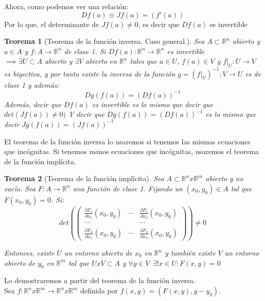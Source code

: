 \documentclass[11pt, a4paper, titlepage]{article}
\makeatletter
\renewenvironment{proof}[1][\proofname] {\vspace{-15pt}\par\pushQED{\qed}\normalfont\topsep6\p@\@plus6\p@\relax\trivlist\item[\hskip\labelsep\it#1\@addpunct{.}]\ignorespaces}{\popQED\endtrivlist\@endpefalse}
\newcommand{\R}{\mathbb{R}}
\theoremstyle{theorem-style}
\newtheorem*{nth}{Teorema}
\theoremstyle{definition-style}
\theoremstyle{remark-style}
\theoremstyle{example-style}
\makeatother
\begin{document}
Ahora, como podemos ver una relación: 
\[
Df(a) \equiv Jf(a) = ( f'(a))
\]
Por lo que, el determinante de $Jf(a) \ne 0$, es decir que $Df(a)$ es invertible
\begin{nth}[Teorema de la función inversa. Caso general.]
	Sea $A \subset \R^n$ abierto y $a\in A$ y $f:A \to \R^n$ de clase 1. Si  
$Df(a): \R^n \to \R^n$ es invertible \\
$\implies \exists U\subset A$ abierto y $\exists V$ abierto en $\R^n$ tales que $a\in U $, $f(a) \in V$ y $f|_U : U \to V$ es biyectiva, y por tanto existe la inversa de la función $g = (f|_U)^{-1}: V \to U$ es de clase 1 y además:
	\[
	Dg(f(a)) = (Df(a))^{-1}
	\]
Además, decir que $Df(a)$ es invertible es lo mismo que decir que $det(Jf(a)) \ne 0)$
Y decir que $Dg(f(a)) = (Df(a))^{-1}$ es lo mismo que decir $Jg(f(a)) = (Jf(a))^{-1}$
\end{nth}

El teorema de la función inversa lo usaremos si tenemos las mismas ecuaciones que incógnitas. Si tenemos menos ecuaciones que incógnitas, usaremos el teorema de la función implícita.

\begin{nth}[Teorema de la función implícita]
	Sea $A \subset \R^n x\R^m$ abierto y no vacío. Sea $F: A \to \R^n$ una función de clase 1. Fijando un $(x_0,y_0) \in A$ tal que $F(x_0,y_0) = 0$. Si:
	\[
	det(\begin{pmatrix}
 \frac{\partial F_1}{\partial n_1}(x_0,y_0) & \cdots & \frac{\partial F_1}{\partial x_n}(x_0,y_0) \\
 \cdots& & \cdots\\
 
 \frac{\partial F_n}{\partial x_1}(x_0,y_0) & \cdots & \frac{\partial F_n}{\partial x_n} (x_0,y_0)
\end{pmatrix}) \ne 0
	\]
	
	Entonces, existe $U$ un entorno abierto de $x_0$ en $\R^n$ y también existe $V$ un entorno abierto de $y_0$ en $\R^m$ tal que $UxV \subset A$ y $\forall y \in V \ \ \exists! x \in U : F(x,y) = 0$
\end{nth}
\begin{proof}
	Lo demostraremos a partir del teorema de la función inversa.\\
	Sea $f:\R^nx\R^m \to \R^nx\R^m$ definida por $f(x,y) = (F(x,y),y-y_0)$.
\end{proof}
\end{document}
